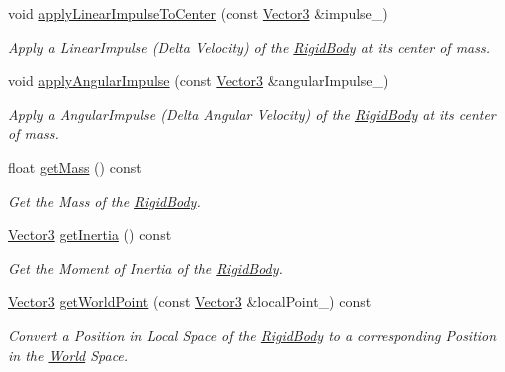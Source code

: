 \begin{DoxyCompactItemize}
void \hyperlink{class_i_dream_sky_1_1_physics3_1_1_vehicle_a0fdb786a7e6265e82fd138b892b2eb46}{apply\+Linear\+Impulse\+To\+Center} (const \hyperlink{class_i_dream_sky_1_1_vector3}{Vector3} \&impulse\+\_\+)
\begin{DoxyCompactList}\small\item\em Apply a Linear\+Impulse (Delta Velocity) of the \hyperlink{class_i_dream_sky_1_1_physics3_1_1_rigid_body}{Rigid\+Body} at its center of mass. \end{DoxyCompactList}\item 
void \hyperlink{class_i_dream_sky_1_1_physics3_1_1_vehicle_a99ab68248390b8279623207a2a36e1fc}{apply\+Angular\+Impulse} (const \hyperlink{class_i_dream_sky_1_1_vector3}{Vector3} \&angular\+Impulse\+\_\+)
\begin{DoxyCompactList}\small\item\em Apply a Angular\+Impulse (Delta Angular Velocity) of the \hyperlink{class_i_dream_sky_1_1_physics3_1_1_rigid_body}{Rigid\+Body} at its center of mass. \end{DoxyCompactList}\item 
float \hyperlink{class_i_dream_sky_1_1_physics3_1_1_vehicle_a05ec7dac7be5b50939f138ef5993461d}{get\+Mass} () const 
\begin{DoxyCompactList}\small\item\em Get the Mass of the \hyperlink{class_i_dream_sky_1_1_physics3_1_1_rigid_body}{Rigid\+Body}. \end{DoxyCompactList}\item 
\hyperlink{class_i_dream_sky_1_1_vector3}{Vector3} \hyperlink{class_i_dream_sky_1_1_physics3_1_1_vehicle_a224b4d79ec89fdfcff1c54e29d8db03a}{get\+Inertia} () const 
\begin{DoxyCompactList}\small\item\em Get the Moment of Inertia of the \hyperlink{class_i_dream_sky_1_1_physics3_1_1_rigid_body}{Rigid\+Body}. \end{DoxyCompactList}\item 
\hyperlink{class_i_dream_sky_1_1_vector3}{Vector3} \hyperlink{class_i_dream_sky_1_1_physics3_1_1_vehicle_a1f1dd24bbd6bbc240ce1e8e3faccf382}{get\+World\+Point} (const \hyperlink{class_i_dream_sky_1_1_vector3}{Vector3} \&local\+Point\+\_\+) const 
\begin{DoxyCompactList}\small\item\em Convert a Position in Local Space of the \hyperlink{class_i_dream_sky_1_1_physics3_1_1_rigid_body}{Rigid\+Body} to a corresponding Position in the \hyperlink{class_i_dream_sky_1_1_physics3_1_1_world}{World} Space. \end{DoxyCompactList}\item 

\end{DoxyCompactItemize}
